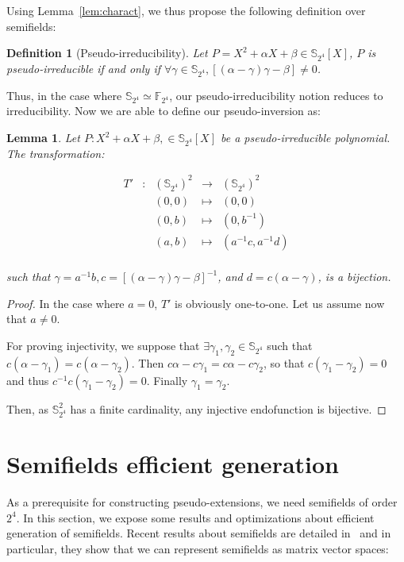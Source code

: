 \documentclass{article}\usepackage{amsthm}
\newtheorem{mydef}{Definition}
\newtheorem{mylem}{Lemma}
\begin{document}
Using Lemma~\ref{lem:charact}, we thus propose the following definition over semifields:
\begin{mydef}[Pseudo-irreducibility]\label{def:pseudoirred}
Let $P=X^2 + \alpha X + \beta \in \mathbb{S}_{2^4}[X] $, $P$ is pseudo-irreducible if and only if $ \forall \gamma \in \mathbb{S}_{2^4}, [(\alpha - \gamma)\gamma -\beta]  \neq 0$.
\end{mydef} 

Thus, in the case where $\mathbb{S}_{2^4} \simeq  \mathbb{F}_{2^4}$,
our pseudo-irreducibility notion reduces to irreducibility. 
Now we are able to define our pseudo-inversion as:
\begin{mylem}\label{lem:pseudoinv}
Let $P : X^2 + \alpha X + \beta, \in \mathbb{S}_{2^4}[X] $ be a pseudo-irreducible polynomial. The transformation: 

$$\begin{array}{ccccc}
	T' & : & (\mathbb{S}_{2^4})^2 & \to & (\mathbb{S}_{2^4})^2 \\
	& & (0,0) & \mapsto & (0,0) \\
	& & (0,b) & \mapsto & (0, b^{-1}) \\	
	& & (a,b) & \mapsto &(a^{-1}c,a^{-1}d)\\
\end{array}$$

such that $\gamma = a^{-1}b, c=[(\alpha - \gamma)\gamma -\beta]^{-1}$, and $d=c(\alpha - \gamma)$, is a bijection.
\end{mylem}

\begin{proof}

In the case where $a=0$, $T'$ is obviously one-to-one.
Let us assume now that $a \ne 0$. 


For proving injectivity, we suppose that $\exists \gamma_1, \gamma_2 \in \mathbb{S}_{2^4}$ such that $c(\alpha-\gamma_1)=c(\alpha-\gamma_2)$.
Then $c\alpha-c\gamma_1=c\alpha-c\gamma_2$, so that $c(\gamma_1-\gamma_2)=0$ and thus $c^{-1}c(\gamma_1-\gamma_2)=0$. Finally $\gamma_1 = \gamma_2$.

Then, as $\mathbb{S}^2_{2^4}$ has a finite cardinality, any injective endofunction 
is bijective.
\end{proof}


\section{Semifields efficient generation}\label{sec:gener}
As a prerequisite for constructing pseudo-extensions, we need semifields of order $2^{4}$. In this section, we expose some results and optimizations about efficient generation of semifields.
Recent results about semifields are detailed in~\cite{Combarro:2011:advances_sf} and in particular, they  show that we can represent semifields as matrix vector spaces:
\end{document}
